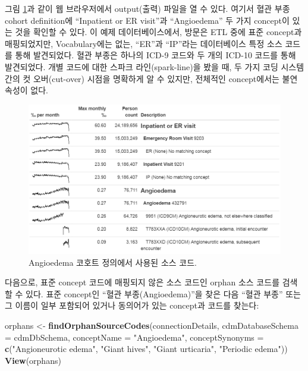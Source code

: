\documentclass[11pt]{book}
\newenvironment{Shaded}{\begin{snugshade}}{\end{snugshade}}
\newcommand{\KeywordTok}[1]{\textcolor[rgb]{0.13,0.29,0.53}{\textbf{#1}}}
\newcommand{\DataTypeTok}[1]{\textcolor[rgb]{0.13,0.29,0.53}{#1}}
\newcommand{\StringTok}[1]{\textcolor[rgb]{0.31,0.60,0.02}{#1}}
\newcommand{\NormalTok}[1]{#1}
\theoremstyle{definition}
\theoremstyle{definition}
\theoremstyle{definition}
\theoremstyle{remark}
\begin{document}
그림 \ref{fig:sourceCodesAngioedema}과 같이 웹 브라우저에서 output(출력)
파일을 열 수 있다. 여기서 혈관 부종 cohort definition에 ``Inpatient or
ER visit''과 ``Angioedema'' 두 가지 concept이 있는 것을 확인할 수 있다.
이 예제 데이터베이스에서, 방문은 ETL 중에 표준 concept과 매핑되었지만,
Vocabulary에는 없는, ``ER''과 ``IP''라는 데이터베이스 특정 소스 코드를
통해 발견되었다. 혈관 부종은 하나의 ICD-9 코드와 두 개의 ICD-10 코드를
통해 발견되었다. 개별 코드에 대한 스파크 라인(spark-line)을 봤을 때, 두
가지 코딩 시스템 간의 컷 오버(cut-over) 시점을 명확하게 알 수 있지만,
전체적인 concept에서는 불연속성이 없다.

\begin{figure}

{\centering \includegraphics[width=1\linewidth]{images/DataQuality/sourceCodesAngioedema} 

}

\caption{Angioedema 코호트 정의에서 사용된 소스 코드.}\label{fig:sourceCodesAngioedema}
\end{figure}

다음으로, 표준 concept 코드에 매핑되지 않은 소스 코드인 orphan 소스
코드를 검색할 수 있다. 표준 concept인 ``혈관 부종(Angioedema)''을 찾은
다음 ``혈관 부종'' 또는 그 이름이 일부 포함되어 있거나 동의어가 있는
concept과 코드를 찾는다:

\begin{Shaded}
\begin{Highlighting}[]
\NormalTok{orphans <-}\StringTok{ }\KeywordTok{findOrphanSourceCodes}\NormalTok{(connectionDetails,}
                                 \DataTypeTok{cdmDatabaseSchema =}\NormalTok{ cdmDbSchema,}
                                 \DataTypeTok{conceptName =} \StringTok{"Angioedema"}\NormalTok{,}
                                 \DataTypeTok{conceptSynonyms =} \KeywordTok{c}\NormalTok{(}\StringTok{"Angioneurotic edema"}\NormalTok{,}
                                                     \StringTok{"Giant hives"}\NormalTok{,}
                                                     \StringTok{"Giant urticaria"}\NormalTok{,}
                                                     \StringTok{"Periodic edema"}\NormalTok{))}
\KeywordTok{View}\NormalTok{(orphans)}
\end{Highlighting}
\end{Shaded}
\end{document}
